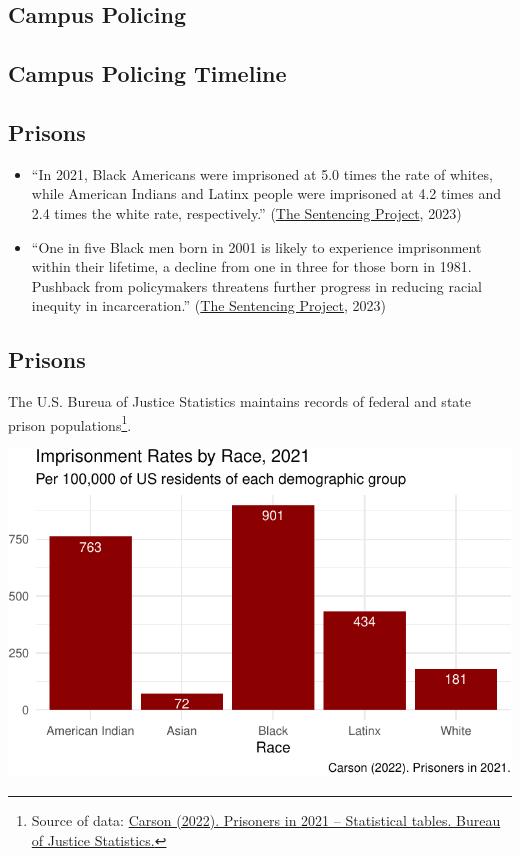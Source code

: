 \documentclass[
  letterpaper,
  DIV=11,
  numbers=noendperiod]{scrartcl}
\begin{document}
\hypertarget{campus-policing}{%
\subsection{Campus Policing}\label{campus-policing}}

\hypertarget{campus-policing-timeline}{%
\subsection{Campus Policing Timeline}\label{campus-policing-timeline}}

\hypertarget{prisons}{%
\subsection{Prisons}\label{prisons}}

\begin{itemize}
\item
  ``In 2021, Black Americans were imprisoned at 5.0 times the rate of
  whites, while American Indians and Latinx people were imprisoned at
  4.2 times and 2.4 times the white rate, respectively.''
  (\href{https://www.sentencingproject.org/reports/one-in-five-ending-racial-inequity-in-incarceration/}{The
  Sentencing Project}, 2023)
\item
  ``One in five Black men born in 2001 is likely to experience
  imprisonment within their lifetime, a decline from one in three for
  those born in 1981. Pushback from policymakers threatens further
  progress in reducing racial inequity in incarceration.''
  (\href{https://www.sentencingproject.org/reports/one-in-five-ending-racial-inequity-in-incarceration/}{The
  Sentencing Project}, 2023)
\end{itemize}

\hypertarget{prisons-1}{%
\subsection{Prisons}\label{prisons-1}}

The U.S. Bureua of Justice Statistics maintains records of federal and
state prison populations\footnote{Source of data:
  \href{https://bjs.ojp.gov/library/publications/prisoners-2021-statistical-tables}{Carson
  (2022). Prisoners in 2021 -- Statistical tables. Bureau of Justice
  Statistics.}}.

\includegraphics{2024_04_27_bob_moses_files/figure-pdf/unnamed-chunk-8-1.pdf}
\end{document}
